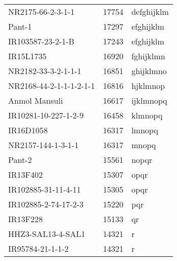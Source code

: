 \documentclass[]{article}
\begin{document}
\begin{longtable}{lll}
\rowcolor{gray!6}  NR2175-66-2-3-1-1 & 17754 & defghijklm\\
Pant-1 & 17297 & efghijklm\\
\rowcolor{gray!6}  IR103587-23-2-1-B & 17243 & efghijklm\\
IR15L1735 & 16920 & fghijklmn\\
\addlinespace
\rowcolor{gray!6}  NR2182-33-3-2-1-1-1 & 16851 & ghijklmno\\
NR2168-44-2-1-1-1-2-1-1 & 16816 & hjklmnop\\
\rowcolor{gray!6}  Anmol Mansuli & 16617 & ijklmnopq\\
IR10281-10-227-1-2-9 & 16458 & klmnopq\\
\rowcolor{gray!6}  IR16D1058 & 16317 & lmnopq\\
\addlinespace
NR2157-144-1-3-1-1 & 16317 & mnopq\\
\rowcolor{gray!6}  Pant-2 & 15561 & nopqr\\
IR13F402 & 15307 & opqr\\
\rowcolor{gray!6}  IR102885-31-11-4-11 & 15305 & opqr\\
IR102885-2-74-17-2-3 & 15220 & pqr\\
\addlinespace
\rowcolor{gray!6}  IR13F228 & 15133 & qr\\
HHZ3-SAL13-4-SAL1 & 14321 & r\\
\rowcolor{gray!6}  IR95784-21-1-1-2 & 14321 & r\\
\bottomrule
\end{longtable}
\endgroup{}
\begingroup\fontsize{12}{14}\selectfont
\end{document}
